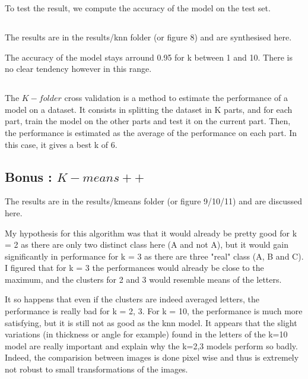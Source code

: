 \documentclass{article}
\begin{document}
To test the result, we compute the accuracy of the model on the test set.

\subsection{}

The results are in the results/knn folder (or figure 8) and are synthesised here.

The accuracy of the model stays arround 0.95 for k between 1 and 10. There is no clear tendency however in this range.

\subsection{}

The $K-folder$ cross validation is a method to estimate the performance of a model on a dataset. It consists in splitting the dataset in K parts, and for each part, train the model on the other parts and test it on the current part. Then, the performance is estimated as the average of the performance on each part.
In this case, it gives a best k of 6.

\subsection{Bonus : $K-means++$}

The results are in the results/kmeans folder (or figure 9/10/11) and are discussed here.\newline

My hypothesis for this algorithm was that it would already be pretty good for k = 2 as there are only two distinct class here (A and not A), but it would gain significantly in performance for k = 3 as there are three "real" class (A, B and C).
I figured that for k = 3 the performances would already be close to the maximum, and the clusters for 2 and 3 would resemble means of the letters.\newline

It so happens that even if the clusters are indeed averaged letters, the performance is really bad for k = 2, 3.
For k = 10, the performance is much more satisfying, but it is still not as good as the knn model.
It appears that the slight variations (in thickness or angle for example) found in the letters of the k=10 model are really important and explain why the k=2,3 models perform so badly. Indeed, the comparision between images is done pixel wise and thus is extremely not robust to small transformations of the images.
\end{document}
